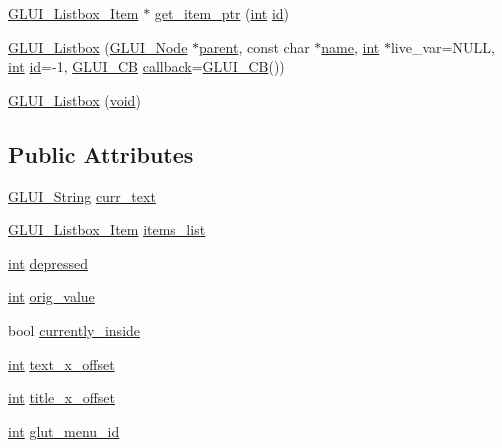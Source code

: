 \begin{DoxyCompactItemize}
\item 
\hyperlink{class_g_l_u_i___listbox___item}{G\+L\+U\+I\+\_\+\+Listbox\+\_\+\+Item} $\ast$ \hyperlink{class_g_l_u_i___listbox_afbf4be7928d629d35eb35f2d51e72eee}{get\+\_\+item\+\_\+ptr} (\hyperlink{wglext_8h_a500a82aecba06f4550f6849b8099ca21}{int} \hyperlink{glext_8h_a58c2a664503e14ffb8f21012aabff3e9}{id})
\item 
\hyperlink{class_g_l_u_i___listbox_a04f341fb0ac378ae1fc09c18f88a393c}{G\+L\+U\+I\+\_\+\+Listbox} (\hyperlink{class_g_l_u_i___node}{G\+L\+U\+I\+\_\+\+Node} $\ast$\hyperlink{class_g_l_u_i___node_a8ed65d447784f6f88bd3e2e2bcac6cdb}{parent}, const char $\ast$\hyperlink{glext_8h_ad977737dfc9a274a62741b9500c49a32}{name}, \hyperlink{wglext_8h_a500a82aecba06f4550f6849b8099ca21}{int} $\ast$live\+\_\+var=N\+U\+L\+L, \hyperlink{wglext_8h_a500a82aecba06f4550f6849b8099ca21}{int} \hyperlink{glext_8h_a58c2a664503e14ffb8f21012aabff3e9}{id}=-\/1, \hyperlink{class_g_l_u_i___c_b}{G\+L\+U\+I\+\_\+\+C\+B} \hyperlink{class_g_l_u_i___control_a96060fe0cc6d537e736dd6eef78e24ab}{callback}=\hyperlink{class_g_l_u_i___c_b}{G\+L\+U\+I\+\_\+\+C\+B}())
\item 
\hyperlink{class_g_l_u_i___listbox_a071ee9024831a4de23995bfefa479466}{G\+L\+U\+I\+\_\+\+Listbox} (\hyperlink{wglext_8h_a9e6b7f1933461ef318bb000d6bd13b83}{void})
\end{DoxyCompactItemize}
\subsection*{Public Attributes}
\begin{DoxyCompactItemize}
\item 
\hyperlink{glui_8h_aada824856f7bcf29794719981ebd8f60}{G\+L\+U\+I\+\_\+\+String} \hyperlink{class_g_l_u_i___listbox_a914b9f8f231fe92b507ec64fbe209271}{curr\+\_\+text}
\item 
\hyperlink{class_g_l_u_i___listbox___item}{G\+L\+U\+I\+\_\+\+Listbox\+\_\+\+Item} \hyperlink{class_g_l_u_i___listbox_a1c6c9d72bdb2c2197ecbe99091534f87}{items\+\_\+list}
\item 
\hyperlink{wglext_8h_a500a82aecba06f4550f6849b8099ca21}{int} \hyperlink{class_g_l_u_i___listbox_a1e00ed51f0b6c8d7e82e8974889a40e7}{depressed}
\item 
\hyperlink{wglext_8h_a500a82aecba06f4550f6849b8099ca21}{int} \hyperlink{class_g_l_u_i___listbox_a5ee58581ac1506984e30868cc8a8c1ec}{orig\+\_\+value}
\item 
bool \hyperlink{class_g_l_u_i___listbox_a5710debcc1604913c926f65db2019b56}{currently\+\_\+inside}
\item 
\hyperlink{wglext_8h_a500a82aecba06f4550f6849b8099ca21}{int} \hyperlink{class_g_l_u_i___listbox_a0f40668bfe80f3fce9c0e027f9e52701}{text\+\_\+x\+\_\+offset}
\item 
\hyperlink{wglext_8h_a500a82aecba06f4550f6849b8099ca21}{int} \hyperlink{class_g_l_u_i___listbox_a4bc9d6c3e849e840b0f61eb446ecba95}{title\+\_\+x\+\_\+offset}
\item 
\hyperlink{wglext_8h_a500a82aecba06f4550f6849b8099ca21}{int} \hyperlink{class_g_l_u_i___listbox_a6efefff573e3d8a77454c94b2aec15c7}{glut\+\_\+menu\+\_\+id}
\end{DoxyCompactItemize}
